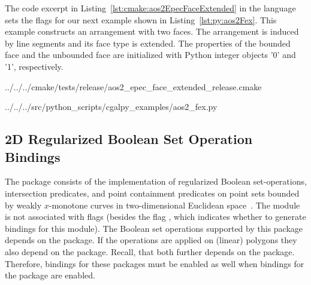 The code excerpt in Listing~\ref{lst:cmake:aos2EpecFaceExtended} in the \cmake{} language sets the \cmake{} flags for our next example shown in Listing~\ref{lst:py:aos2Fex}. This example constructs an arrangement with two faces. The arrangement is induced by line segments and its face type is extended. The properties of the bounded face and the unbounded face are initialized with Python integer objects '0' and '1', respectively.

\begin{lstfloat}
%
                 {../../../cmake/tests/release/aos2_epec_face_extended_release.cmake}
\end{lstfloat}

\begin{lstfloat}
  
                  {../../../src/python_scripts/cgalpy_examples/aos2_fex.py}
\end{lstfloat}

\subsection{2D Regularized Boolean Set Operation Bindings}
\label{ssec:modules:bso2}
The \cgal{} package \iiDRegularizedBooleanSetOperationsPackage{} consists of the implementation of regularized Boolean set-operations, intersection predicates, and point containment predicates on point sets bounded by weakly $x$-monotone curves in two-dimensional Euclidean space~\cite{cgal:fwzh-rbso2-21a}. The \iiDRegularizedBooleanSetOperationsPackage{} module is not associated with \cmake{} flags (besides the flag , which indicates whether to generate bindings for this module). The Boolean set operations supported by this package depends on the \iiDArrangementsPackage{} package. If the operations are applied on (linear) polygons they also depend on the \iiDPolygonsPackage{} package. Recall, that both further depends on the \iiDandiiiDGeometryKernelPackage{} package. Therefore, bindings for these packages must be enabled as well when bindings for the \iiDRegularizedBooleanSetOperationsPackage{} package are enabled.

